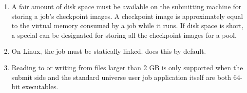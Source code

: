 \begin{enumerate}
\item A fair amount of disk space must be available on the submitting machine
for storing a job's checkpoint images.  A checkpoint image is approximately
equal to the virtual memory consumed by a job while it runs.  If disk space
is short, a special  can be designated for storing
all the checkpoint images for a pool.

\item On Linux, the job must be statically linked. 
 does this by default.

\item Reading to or writing from files larger than 2 GB is only supported
when the submit side  and the standard universe user job
application itself are both 64-bit executables.

\end{enumerate}



